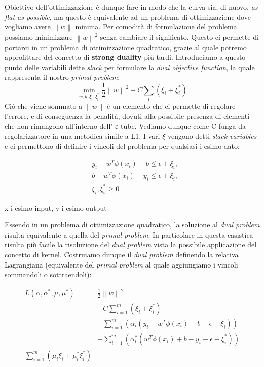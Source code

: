 \documentclass[12pt]{article}
\newcommand{\norm}[1]{\left\lVert#1\right\rVert}
\begin{document}
Obiettivo dell’ottimizzazione è dunque fare in modo che la curva sia, di nuovo, \textit{as flat as possible}, ma questo è equivalente ad un problema di ottimizzazione dove vogliamo avere $\norm{w}$ minima. 
Per comodità di formulazione del problema possiamo minimizzare $\norm{w}^2$ senza cambiare il significato. Questo ci permette di portarci in un problema di ottimizzazione quadratico, grazie al quale potremo approfittare del concetto di \textbf{strong duality} più tardi. 
Introduciamo a questo punto delle variabili dette \textit{slack} per formulare la \textit{dual objective function}, la quale rappresenta il nostro \textit{primal problem}:
	\begin{equation}\label{eq:1}
		\min_{w,b,\xi_i,\xi_i^*} \frac{1}{2}\norm{w}^2+C\sum_{i}(\xi_{i} + \xi_{i}^*)
	\end{equation}
	Ciò che viene sommato a $\norm{w}$ è un elemento che ci permette di regolare l’errore, e di conseguenza la penalità, dovuti alla possibile presenza di elementi che non rimangono all’interno dell’ $\varepsilon$-tube. Vediamo dunque come C funga da regolarizzatore in una metodica simile a L1. I vari $\xi$ vengono detti \textit{slack variables} e ci permettono di definire i vincoli del problema per qualsiasi i-esimo dato:

	\begin{equation}\label{eq:2}
	\begin{aligned}
		&y_i - w^T\phi(x_i) - b \leq \epsilon + \xi_i,  \\ 
		&b + w^T\phi(x_i) - y_i \leq \epsilon + \xi_i, \\
		&\xi_i,\xi_i^*  \geq 0
	\end{aligned}
	\end{equation}

	\begin{center}
		\footnotesize{x i-esimo input, y i-esimo output}
	\end{center}
	
	Essendo in un problema di ottimizzazione quadratico, la soluzione al \textit{dual problem} risulta equivalente a quella del \textit{primal problem}. In particolare in questa casistica risulta più facile la risoluzione del \textit{dual problem} vista la possibile applicazione del concetto di kernel. Costruiamo dunque il \textit{dual problem} definendo la relativa Lagrangiana (equivalente del \textit{primal problem} al quale aggiungiamo i vincoli sommandoli o sottraendoli):
	

	\begin{equation}\label{eq:3}
	\begin{aligned}
		L(\alpha,\alpha^*,\mu,\mu^*) =  \ &\frac{1}{2}\norm{w}^2\\
		&+C\sum_{i=1}^{m}(\xi_{i} + \xi_{i}^*) \\
		&+ \sum_{i=1}^{m}(\alpha_i(y_i - w^T\phi(x_i) - b - \epsilon - \xi_i))\\
		&+ \sum_{i=1}^{m}(\alpha_i^*(w^T\phi(x_i) + b - y_i - \epsilon - \xi_i^*)) \\
		\sum_{i=1}^{m}(\mu_i\xi_i + \mu_i^*\xi_i^*)
	\end{aligned}
	\end{equation}
\end{document}
